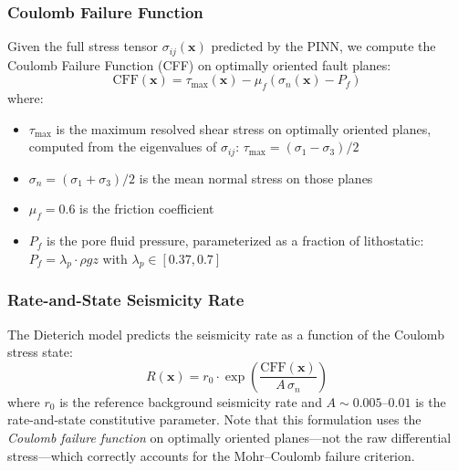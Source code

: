\documentclass[11pt, a4paper]{article}
\begin{document}
\subsubsection{Coulomb Failure Function}
Given the full stress tensor $\sigma_{ij}(\mathbf{x})$ predicted by the PINN, we compute the Coulomb Failure Function (CFF) on optimally oriented fault planes:
\begin{equation}
    \text{CFF}(\mathbf{x}) = \tau_{\max}(\mathbf{x}) - \mu_f \left(\sigma_n(\mathbf{x}) - P_f\right)
    \label{eq:cff}
\end{equation}
where:
\begin{itemize}
    \item $\tau_{\max}$ is the maximum resolved shear stress on optimally oriented planes, computed from the eigenvalues of $\sigma_{ij}$: $\tau_{\max} = (\sigma_1 - \sigma_3)/2$
    \item $\sigma_n = (\sigma_1 + \sigma_3)/2$ is the mean normal stress on those planes
    \item $\mu_f = 0.6$ is the friction coefficient \cite{Byerlee1978}
    \item $P_f$ is the pore fluid pressure, parameterized as a fraction of lithostatic: $P_f = \lambda_p \cdot \rho g z$ with $\lambda_p \in [0.37, 0.7]$
\end{itemize}

\subsubsection{Rate-and-State Seismicity Rate}
The Dieterich \cite{Dieterich1994} model predicts the seismicity rate as a function of the Coulomb stress state:
\begin{equation}
    R(\mathbf{x}) = r_0 \cdot \exp\!\left(\frac{\text{CFF}(\mathbf{x})}{A\,\sigma_n}\right)
    \label{eq:dieterich}
\end{equation}
where $r_0$ is the reference background seismicity rate and $A \sim 0.005$--$0.01$ is the rate-and-state constitutive parameter. Note that this formulation uses the \textit{Coulomb failure function} on optimally oriented planes---not the raw differential stress---which correctly accounts for the Mohr--Coulomb failure criterion.
\end{document}
